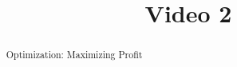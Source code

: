 \documentclass[handout]{ximera}
\title{Video 2}
\begin{document}
\begin{abstract}
Optimization: Maximizing Profit
\end{abstract}

\maketitle

\end{document}
